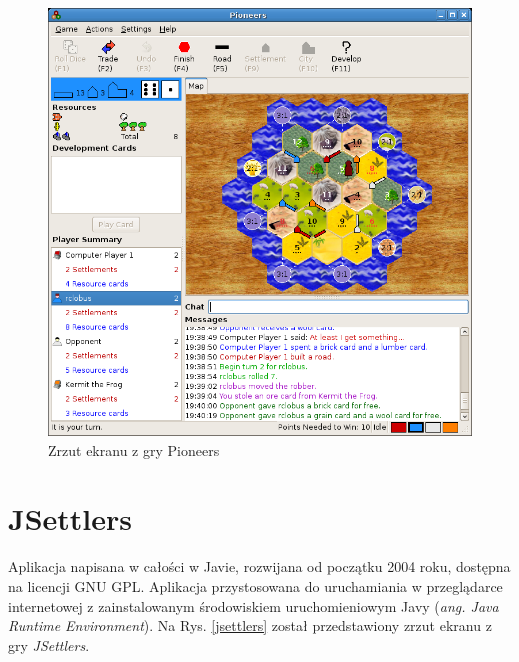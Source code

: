\documentclass[11pt,twoside]{report}
\providecommand{\imref}[1]{Rys. \ref{#1}} %
\begin{document}
\begin{figure}[ht]
  \begin{center}
    \includegraphics[width=\linewidth]{pioneers.png}
  \end{center}
  \caption{Zrzut ekranu z gry Pioneers}
  \label{pioneers}
\end{figure}

\section{JSettlers}
Aplikacja napisana w całości w Javie, rozwijana od początku 2004 roku,
dostępna na licencji GNU GPL\cite{jsettlers}. Aplikacja przystosowana
do uruchamiania w przeglądarce internetowej z zainstalowanym
środowiskiem uruchomieniowym Javy (\emph{ang. Java Runtime
  Environment}). Na \imref{jsettlers} został przedstawiony zrzut
ekranu z gry \emph{JSettlers}.
\end{document}
